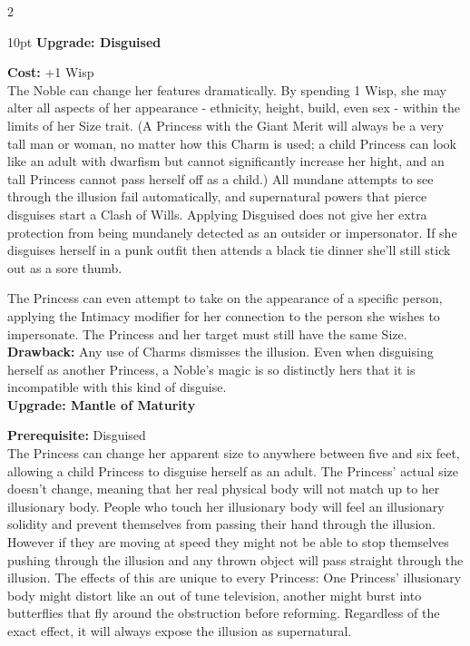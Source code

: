 \begin{multicols}{2}
\begin{myindentpar}{10pt}
\textbf{Upgrade: Disguised}

\noindent \textbf{Cost:} +1 Wisp\\

\noindent The Noble can change her features dramatically. By spending 1 Wisp, she may alter all aspects of her appearance - ethnicity, height, build, even sex - within the limits of her Size trait. (A Princess with the Giant Merit will always be a very tall man or woman, no matter how this Charm is used; a child Princess can look like an adult with dwarfism but cannot significantly increase her hight, and an tall Princess cannot pass herself off as a child.) All mundane attempts to see through the illusion fail automatically, and supernatural powers that pierce disguises start a Clash of Wills. Applying Disguised does not give her extra protection from being mundanely detected as an outsider or impersonator. If she disguises herself in a punk outfit then attends a black tie dinner she'll still stick out as a sore thumb. 

The Princess can even attempt to take on the appearance of a specific person, applying the Intimacy modifier for her connection to the person she wishes to impersonate. The Princess and her target must still have the same Size.\\

\noindent \textbf{Drawback:} Any use of Charms dismisses the illusion. Even when disguising herself as another Princess, a Noble's magic is so distinctly hers that it is incompatible with this kind of disguise.  \\

\textbf{Upgrade: Mantle of Maturity}

\noindent \textbf{Prerequisite:} Disguised\\

The Princess can change her apparent size to anywhere between five and six feet, allowing a child Princess to disguise herself as an adult. The Princess' actual size doesn't change, meaning that her real physical body will not match up to her illusionary body. People who touch her illusionary body will feel an illusionary solidity and prevent themselves from passing their hand through the illusion. However if they are moving at speed they might not be able to stop themselves pushing through the illusion and any thrown object will pass straight through the illusion. The effects of this are unique to every Princess: One Princess' illusionary body might distort like an out of tune television, another might burst into butterflies that fly around the obstruction before reforming. Regardless of the exact effect, it will always expose the illusion as supernatural. 


\end{myindentpar}
\end{multicols}
